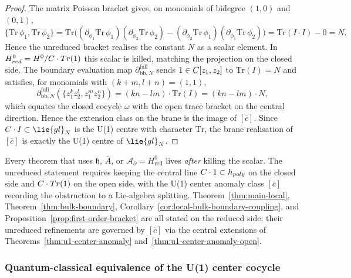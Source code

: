 \documentclass[11pt]{memoir}
\begin{document}
\begin{proof}
  The matrix Poisson bracket gives, on monomials of bidegree $(1,0)$ and
  $(0,1)$,
  $$\{\mathrm{Tr}\,\phi_1,\mathrm{Tr}\,\phi_2\}
    =\mathrm{Tr}\bigl((\partial_{\phi_1}\mathrm{Tr}\,\phi_1)
      (\partial_{\phi_2}\mathrm{Tr}\,\phi_2)
      -(\partial_{\phi_2}\mathrm{Tr}\,\phi_1)
      (\partial_{\phi_1}\mathrm{Tr}\,\phi_2)\bigr)
    =\mathrm{Tr}(I\cdot I)-0=N.$$
  Hence the unreduced bracket realises the constant $N$ as a scalar element.
  In $H^0_{red}=H^0/C\cdot Tr(1)$ this scalar is killed,
  matching the projection on the closed side. The boundary evaluation map
  $\partial_{\mathrm{bb},N}^{\mathrm{full}}$ sends $1\in C[z_1,z_2]$ to
  $\mathrm{Tr}(I)=N$ and satisfies, for monomials with $(k+m,l+n)=(1,1)$,
  $$\partial_{\mathrm{bb},N}^{\mathrm{full}}(\{z_1^kz_2^l,z_1^mz_2^n\})
    =(kn-lm)\cdot\mathrm{Tr}(I)
    =(kn-lm)\cdot N,$$
  which equates the closed cocycle $\omega$ with the open trace bracket on
  the central direction. Hence the extension class on the brane is the
  image of $[\bar c]$. Since $\C\cdot I\subset\lie{gl}_N$ is the U(1) centre
  with character $\mathrm{Tr}$, the brane realisation of $[\bar c]$ is
  exactly the U(1) centre of $\lie{gl}_N$.
\end{proof}

\begin{rmk}\label{rmk:quotient-discipline-flag}
  Every theorem that uses $\mathfrak h$, $\bar A$, or
  $\mathcal A_{\partial}=H^0_{\mathrm{red}}$ lives \emph{after} killing the
  scalar. The unreduced statement requires keeping the central line
  $C\cdot 1\subset h_{poly}$ on the closed side and
  $C\cdot Tr(1)$ on the open side, with the U(1) center anomaly
  class $[\bar c]$ recording the obstruction to a Lie-algebra splitting.
  Theorem~\ref{thm:main-local}, Theorem~\ref{thm:bulk-boundary},
  Corollary~\ref{cor:local-bulk-boundary-coupling}, and
  Proposition~\ref{prop:first-order-bracket} are all stated on the reduced
  side; their unreduced refinements are governed by $[\bar c]$ via the
  central extensions of Theorems~\ref{thm:u1-center-anomaly}
  and~\ref{thm:u1-center-anomaly-open}.
\end{rmk}

\subsubsection*{Quantum-classical equivalence of the U(1) center cocycle}
\end{document}
